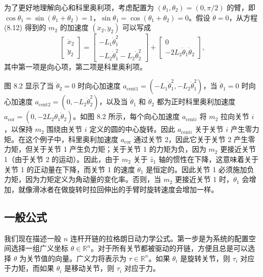 \documentclass[12pt,a4paper]{article}
\begin{document}
为了更好地理解向心和科里奥利项，考虑配置为 $(\theta_1, \theta_2) = (0, \pi/2)$ 的臂，即 $\cos \theta_1 = \sin(\theta_1 + \theta_2) = 1$，$\sin \theta_1 = \cos(\theta_1 + \theta_2) = 0$。假设 $\ddot{\theta} = 0$，从方程 (8.12) 得到的 $m_2$ 的加速度 $(\ddot{x}_2, \ddot{y}_2)$ 可以写成
\begin{equation}
\begin{bmatrix} \ddot{x}_2 \\ \ddot{y}_2 \end{bmatrix} = \begin{bmatrix} -L_1 \dot{\theta}_1^2 \\ -L_2 \dot{\theta}_1^2 - L_2 \dot{\theta}_2^2 \end{bmatrix} + \begin{bmatrix} 0 \\ -2L_2 \dot{\theta}_1 \dot{\theta}_2 \end{bmatrix},
\end{equation}
其中第一项是向心项，第二项是科里奥利项。

图 8.2 显示了当 $\dot{\theta}_2 = 0$ 时向心加速度 $a_{\text{cent}1} = (-L_1 \dot{\theta}_1^2, -L_2 \dot{\theta}_1^2)$，当 $\dot{\theta}_1 = 0$ 时向心加速度 $a_{\text{cent}2} = (0, -L_2 \dot{\theta}_2^2)$，以及当 $\dot{\theta}_1$ 和 $\dot{\theta}_2$ 都为正时科里奥利加速度 $a_{\text{cor}} = (0, -2L_2 \dot{\theta}_1 \dot{\theta}_2)$。如图 8.2 所示，每个向心加速度 $a_{\text{cent}i}$ 将 $m_2$ 拉向关节 $i$，以保持 $m_2$ 围绕由关节 $i$ 定义的圆的中心旋转。因此 $a_{\text{cent}i}$ 关于关节 $i$ 产生零力矩。在这个例子中，科里奥利加速度 $a_{\text{cor}}$ 通过关节 2，因此它关于关节 2 产生零力矩，但关于关节 1 产生负力矩；关于关节 1 的力矩为负，因为 $m_2$ 更接近关节 1（由于关节 2 的运动）。因此，由于 $m_2$ 关于 $\hat{z}_1$ 轴的惯性在下降，这意味着关于关节 1 的正动量在下降，而关节 1 的速度 $\dot{\theta}_1$ 是恒定的。因此关节 1 必须施加负力矩，因为力矩定义为角动量的变化率。否则，当 $m_2$ 更接近关节 1 时，$\dot{\theta}_1$ 会增加，就像滑冰者在做旋转时拉回伸出的手臂时旋转速度会增加一样。

\subsection{一般公式}

我们现在描述一般 $n$ 连杆开链的拉格朗日动力学公式。第一步是为系统的配置空间选择一组广义坐标 $\theta \in \mathbb{R}^n$。对于所有关节都被驱动的开链，方便且总是可以选择 $\theta$ 为关节值的向量。广义力将表示为 $\tau \in \mathbb{R}^n$。如果 $\theta_i$ 是旋转关节，则 $\tau_i$ 对应于力矩，而如果 $\theta_i$ 是移动关节，则 $\tau_i$ 对应于力。
\end{document}
